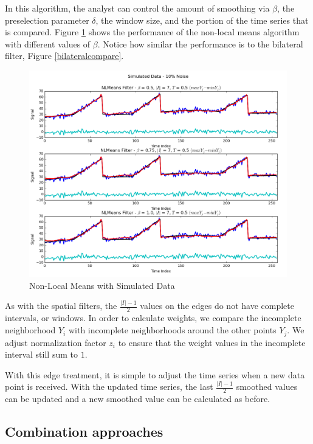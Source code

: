 \documentclass[11pt]{article}
\theoremstyle{definition}
\begin{document}
In this algorithm, the analyst can control the amount of smoothing via
$\beta$, the preselection parameter $\delta$, the window size, and the
portion of the time series that is compared. Figure
\ref{nlmeanscompare} shows the performance of the non-local means
algorithm with different values of $\beta$. Notice how similar the
performance is to the bilateral filter, Figure \ref{bilateralcompare}.

\begin{figure}[h!]
\centering
\includegraphics[width = 0.9 \textwidth]{NLMeansCompare.png}
\caption{Non-Local Means with Simulated Data}
\label{nlmeanscompare}
\end{figure}

As with the spatial filters, the $\frac{\lvert I \rvert - 1}{2}$
values on the edges do not have complete intervals, or windows. In
order to calculate weights, we compare the incomplete neighborhood
$Y_i$ with incomplete neighborhoods around the other points $Y_j$. We
adjust normalization factor $z_i$ to ensure that the weight values in
the incomplete interval still sum to $1$.

With this edge treatment, it is simple to adjust the time series when
a new data point is received. With the updated time series, the last
$\frac{\lvert I \rvert - 1}{2}$ smoothed values can be updated and a
new smoothed value can be calculated as before.


\FloatBarrier

\subsection{Combination approaches} 
\end{document}
